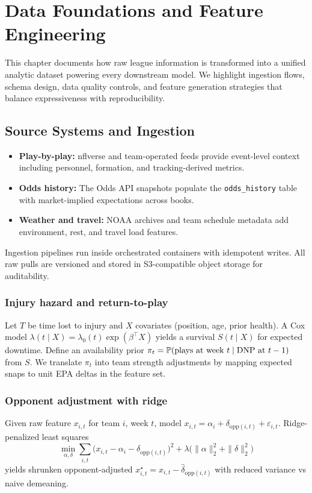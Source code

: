 \chapter{Data Foundations and Feature Engineering}
\label{chap:data}

This chapter documents how raw league information is transformed into a unified analytic dataset powering every downstream model. We highlight ingestion flows, schema design, data quality controls, and feature generation strategies that balance expressiveness with reproducibility.



\section{Source Systems and Ingestion}
\begin{itemize}
  \item \textbf{Play-by-play:} nflverse and team-operated feeds provide event-level context including personnel, formation, and tracking-derived metrics.
  \item \textbf{Odds history:} The Odds API snapshots populate the \texttt{odds\_history} table with market-implied expectations across books.
  \item \textbf{Weather and travel:} NOAA archives and team schedule metadata add environment, rest, and travel load features.
\end{itemize}
Ingestion pipelines run inside orchestrated containers with idempotent writes. All raw pulls are versioned and stored in S3-compatible object storage for auditability.

\subsection{Injury hazard and return-to-play}\label{subsec:injury-hazard}
Let $T$ be time lost to injury and $X$ covariates (position, age, prior health). A Cox model
$\lambda(t\mid X)=\lambda_0(t)\exp(\beta^\top X)$ yields a survival $S(t\mid X)$ for expected
downtime. Define an availability prior $\pi_t=\mathbb{P}(\text{plays at week }t\mid \text{DNP at }t-1)$
from $S$. We translate $\pi_t$ into team strength adjustments by mapping expected snaps to unit
EPA deltas in the feature set.

\subsection{Opponent adjustment with ridge}\label{subsec:opp-ridge}
Given raw feature $x_{i,t}$ for team $i$, week $t$, model
$x_{i,t} = \alpha_i + \delta_{\text{opp}(i,t)} + \varepsilon_{i,t}$. Ridge-penalized least squares
\[
\min_{\alpha,\delta}\sum_{i,t}\!\big(x_{i,t}-\alpha_i-\delta_{\text{opp}(i,t)}\big)^2
+ \lambda\big(\|\alpha\|_2^2+\|\delta\|_2^2\big)
\]
yields shrunken opponent-adjusted $x_{i,t}^\star=x_{i,t}-\hat\delta_{\text{opp}(i,t)}$ with reduced
variance vs naive demeaning.



